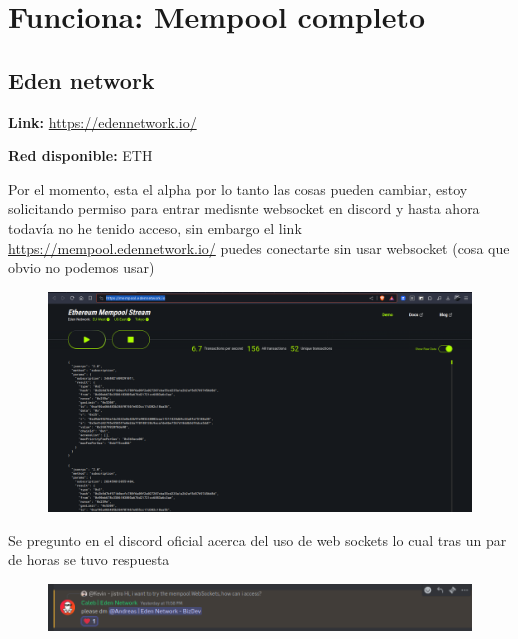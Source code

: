 
\section{Funciona: Mempool completo}

\subsection{Eden network}

\textbf{Link:} \url{https://edennetwork.io/}

\textbf{Red disponible:} ETH

\medskip

Por el momento, esta el alpha por lo tanto las cosas pueden cambiar, estoy solicitando permiso para entrar medisnte websocket en discord y hasta ahora todavía no he tenido acceso, sin embargo el link \url{https://mempool.edennetwork.io/} puedes conectarte sin usar websocket (cosa que obvio no podemos usar)

\begin{figure}
    \centering
    \includegraphics[width=1\linewidth]{img//screenshots/Screenshot from 2023-12-15 22-38-01.png}
\end{figure}

Se pregunto en el discord oficial acerca del uso de web sockets lo cual tras un par de horas se tuvo respuesta

\begin{figure}
    \centering
    \includegraphics[width=1\linewidth]{Screenshot from 2023-12-16 00-09-47.png}
\end{figure}

